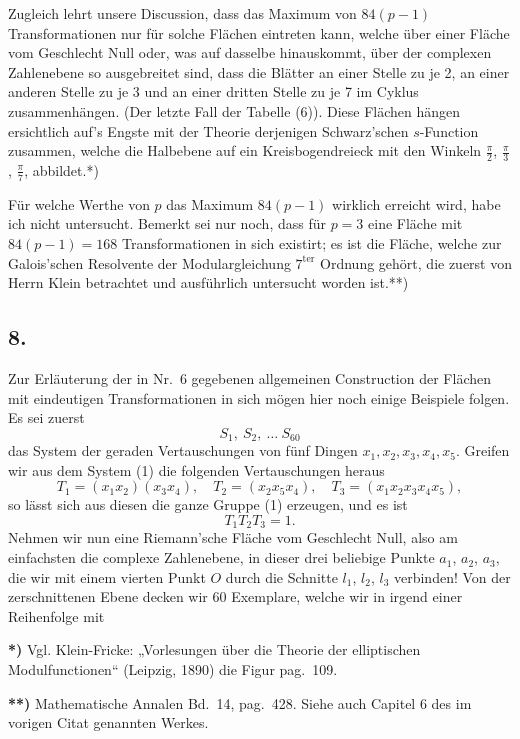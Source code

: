 \documentclass{article}
\begin{document}
Zugleich lehrt unsere Discussion, dass das Maximum von $84(p - 1)$ Transformationen nur für solche Flächen eintreten kann, welche über einer Fläche vom Geschlecht Null oder, was auf dasselbe hinauskommt, über der complexen Zahlenebene so ausgebreitet sind, dass die Blätter an einer Stelle zu je 2, an einer anderen Stelle zu je 3 und an einer dritten Stelle zu je 7 im Cyklus zusammenhängen. (Der letzte Fall der Tabelle (6)). Diese Flächen hängen ersichtlich auf's Engste mit der Theorie derjenigen Schwarz'schen $s$-Function zusammen, welche die Halbebene auf ein Kreisbogendreieck mit den Winkeln $\frac{\pi}{2}$, $\frac{\pi}{3}$, $\frac{\pi}{7}$, abbildet.*)

Für welche Werthe von $p$ das Maximum $84(p - 1)$ wirklich erreicht wird, habe ich nicht untersucht. Bemerkt sei nur noch, dass für $p = 3$ eine Fläche mit $84(p - 1) = 168$ Transformationen in sich existirt; es ist die Fläche, welche zur Galois'schen Resolvente der Modulargleichung $7^{\text{ter}}$ Ordnung gehört, die zuerst von Herrn Klein betrachtet und ausführlich untersucht worden ist.**)

\subsection*{8.}

Zur Erläuterung der in Nr.~6 gegebenen allgemeinen Construction der Flächen mit eindeutigen Transformationen in sich mögen hier noch einige Beispiele folgen. Es sei zuerst
\[
S_1, \ S_2, \ \dots \ S_{60}
\tag{1}
\]
das System der geraden Vertauschungen von fünf Dingen $x_1, x_2, x_3, x_4, x_5$. Greifen wir aus dem System (1) die folgenden Vertauschungen heraus
\[
T_1 = (x_1 x_2)(x_3 x_4), \quad T_2 = (x_2 x_5 x_4), \quad T_3 = (x_1 x_2 x_3 x_4 x_5),
\]
so lässt sich aus diesen die ganze Gruppe (1) erzeugen, und es ist
\[
T_1 T_2 T_3 = 1.
\]
Nehmen wir nun eine Riemann'sche Fläche vom Geschlecht Null, also am einfachsten die complexe Zahlenebene, in dieser drei beliebige Punkte $a_1$, $a_2$, $a_3$, die wir mit einem vierten Punkt $O$ durch die Schnitte $l_1$, $l_2$, $l_3$ verbinden! Von der zerschnittenen Ebene decken wir 60 Exemplare, welche wir in irgend einer Reihenfolge mit

\textbf{*)} Vgl. Klein-Fricke: „Vorlesungen über die Theorie der elliptischen Modulfunctionen“ (Leipzig, 1890) die Figur pag.~109.

\textbf{**)} Mathematische Annalen Bd.~14, pag.~428. Siehe auch Capitel 6 des im vorigen Citat genannten Werkes.
\end{document}
